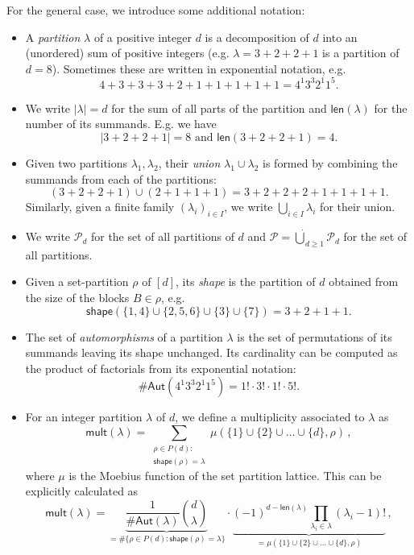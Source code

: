 \documentclass[authorcolumns,numberwithinsect]{no-lipics-v2022}
\begin{document}
For the general case, we introduce some additional notation:
\begin{itemize}
    \item A \emph{partition} $\lambda$ of a positive integer $d$ is a decomposition of $d$ into an (unordered) sum of positive integers (e.g. $\lambda=3+2+2+1$ is a partition of $d=8$). Sometimes these are written in exponential notation, e.g.
    \[
    4+3+3+3+2+1+1+1+1+1 = 4^1 3^3 2^1 1^5.
    \]
    \item We write $|\lambda|=d$ for the sum of all parts of the partition and $\mathsf{len}(\lambda)$ for the number of its summands. E.g. we have
    \[
    |3+2+2+1| = 8 \text{ and }\mathsf{len}(3+2+2+1)=4.
    \]
    \item Given two partitions $\lambda_1, \lambda_2$, their \emph{union} $\lambda_1 \cup \lambda_2$ is formed by combining the summands from each of the partitions:
    \[
    (3+2+2+1) \cup (2+1+1+1) = 3 + 2+2+2 + 1 + 1 + 1 + 1.
    \]
    Similarly, given a finite family $(\lambda_i)_{i \in I}$, we write $\bigcup_{i \in I} \lambda_i$ for their union.
    \item We write $\mathcal{P}_d$ for the set of all partitions of $d$ and $\mathcal{P} = \dot\bigcup_{d \geq 1} \mathcal{P}_d$ for the set of all partitions.
    \item Given a set-partition $\rho$ of $[d]$, its \emph{shape} is the partition of $d$ obtained from the size of the blocks $B \in \rho$, e.g.
    \[
    \mathsf{shape}(\{1,4\} \cup \{2,5,6\} \cup \{3\} \cup \{7\}) = 3 + 2 + 1 + 1.
    \]
    \item The set of \emph{automorphisms} of a partition $\lambda$ is the set of permutations of its summands leaving its shape unchanged. Its cardinality can be computed as the product of factorials from its exponential notation:
    \[
    \# \mathsf{Aut}(4^1 3^3 2^1 1^5) = 1! \cdot 3! \cdot 1! \cdot 5!.
    \]
    \item For an integer partition $\lambda$ of $d$, we define a multiplicity associated to $\lambda$ as
    \[
    \mathsf{mult}(\lambda) = \sum_{\substack{\rho \in P(d):\\\mathsf{shape}(\rho)=\lambda}} \mu(\{1\} \cup \{2\} \cup \ldots \cup \{d\}, \rho)\,,
    \]
    where $\mu$ is the Moebius function of the set partition lattice. This can be explicitly calculated as
    \begin{equation}
        \mathsf{mult}(\lambda) = \underbrace{\frac{1}{\# \mathsf{Aut}(\lambda)} \binom{d}{\lambda}}_{=\#\{\rho \in P(d): \mathsf{shape}(\rho)=\lambda\}} \cdot \underbrace{(-1)^{d-\mathsf{len}(\lambda)} \prod_{\lambda_i \in \lambda} (\lambda_i-1)!}_{=\mu(\{1\} \cup \{2\} \cup \ldots \cup \{d\}, \rho)}\,,

\end{equation}
\end{itemize}
\end{document}
